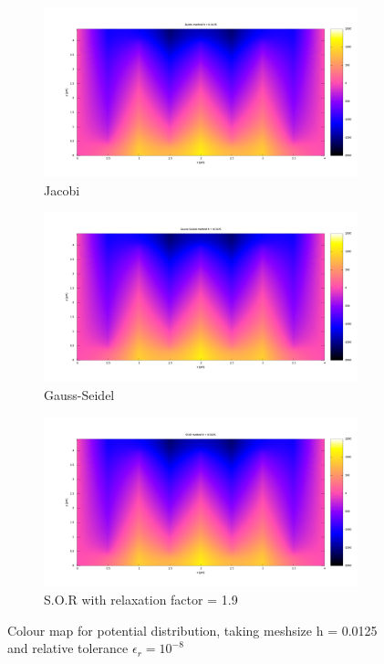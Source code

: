 \begin{figure}[h]
    \centering
    \begin{subfigure}{.5\textwidth}
      \centering
      \includegraphics[width=.9\linewidth]{content/graphs/Jacobi_0125_map.png}
      \caption{Jacobi}
      \label{fig:sub1}
    \end{subfigure}%
    \begin{subfigure}{.5\textwidth}
      \centering
      \includegraphics[width=.9\linewidth]{content/graphs/Gauss_0125_map.png}
      \caption{Gauss-Seidel}
      \label{fig:sub2}
    \end{subfigure}
    \begin{subfigure}{.5\textwidth}
        \centering
        \includegraphics[width=.9\linewidth]{content/graphs/SOR_0125_map.png}
        \caption{S.O.R with relaxation factor = 1.9}
        \label{fig:sub3}
    \end{subfigure}
    \caption{ Colour map for potential distribution, taking meshsize h = 0.0125 and relative tolerance $\epsilon_r = 10^{-8}$}
    \label{fig:}
\end{figure}

